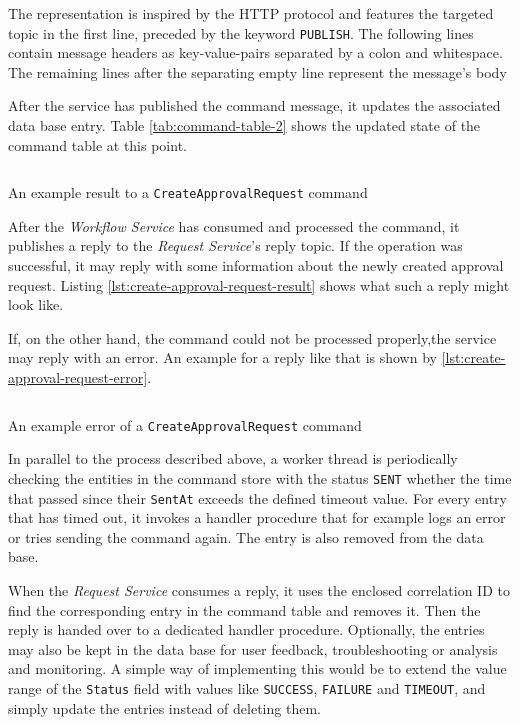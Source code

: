 The representation is inspired by the HTTP protocol and features the targeted topic in the first line, preceded by the keyword \texttt{PUBLISH}.
The following lines contain message headers as key-value-pairs separated by a colon and whitespace.
The remaining lines after the separating empty line represent the message's body

After the service has published the command message, it updates the associated data base entry.
Table \ref{tab:command-table-2} shows the updated state of the command table at this point.

\begin{listing}[h]
  \inputminted{text}{assets/src/create-approval-request-result.txt}
  \caption{An example result to a \texttt{CreateApprovalRequest} command}\label{lst:create-approval-request-result}
\end{listing}

After the \emph{Workflow Service} has consumed and processed the command, it publishes a reply to the \emph{Request Service}'s reply topic.
If the operation was successful, it may reply with some information about the newly created approval request.
Listing \ref{lst:create-approval-request-result} shows what such a reply might look like.

If, on the other hand, the command could not be processed properly,the service may reply with an error.
An example for a reply like that is shown by \ref{lst:create-approval-request-error}.

\begin{listing}[h]
  \inputminted{text}{assets/src/error.txt}
  \caption{An example error of a \texttt{CreateApprovalRequest} command}\label{lst:create-approval-request-error}
\end{listing}

In parallel to the process described above, a worker thread is periodically checking the entities in the command store with the status \texttt{SENT} whether the time that passed since their \texttt{SentAt} exceeds the defined timeout value.
For every entry that has timed out, it invokes a handler procedure that for example logs an error or tries sending the command again.
The entry is also removed from the data base.

When the \emph{Request Service} consumes a reply, it uses the enclosed correlation ID to find the corresponding entry in the command table and removes it.
Then the reply is handed over to a dedicated handler procedure.
Optionally, the entries may also be kept in the data base for user feedback, troubleshooting or analysis and monitoring.
A simple way of implementing this would be to extend the value range of the \texttt{Status} field with values like \texttt{SUCCESS}, \texttt{FAILURE} and \texttt{TIMEOUT}, and simply update the entries instead of deleting them.

